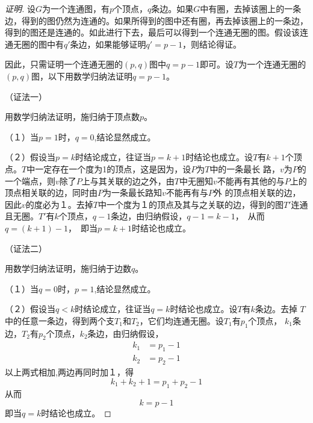 \begin{proof}[证明]
      设$G$为一个连通图，有$p$个顶点，$q$条边。如果$G$中有圈，去掉该圈上的一条边，得到的图仍然为连通的。如果所得到的图中还有圈，再去掉该圈上的一条边，得到的图还是连通的。如此进行下去，最后可以得到一个连通无圈的图。假设该连通无圈的图中有$q'$条边，如果能够证明$q'=p-1$，则结论得证。

    因此，只需证明一个连通无圈的$(p,q)$图中$q=p-1$即可。设$T$为一个连通无圈的$(p,q)$图，以下用数学归纳法证明$q=p-1$。

    
  （证法一）
  
    用数学归纳法证明，施归纳于顶点数$p$。
    
    （１）当$p=1$时，$q=0$,结论显然成立。

    （２）假设当$p=k$时结论成立，往证当$p=k+1$时结论也成立。设$T$有$k+1$个顶点。$T$中一定存在一个度为1的顶点，这是因为，设$P$为$T$中的一条最长
    路，$v$为$P$的一个端点，则$v$除了$P$上与其关联的边之外，由$T$中无圈知$v$不能再有其他的与$P$上的顶点相关联的边，同时由$P$为一条最长路知$v$不能再有与$P$外
    的顶点相关联的边，因此$v$的度必为１。去掉$T$中一个度为１的顶点及其与之关联的边，得到的图$T'$连通且无圈。$T'$有$k$个顶点，$q-1$条边，由归纳假设，$q-1 = k - 1$，　从而$q = (k +1) - 1$，　即当$p=k+1$时结论也成立。

    （证法二）
    
      用数学归纳法证明，施归纳于边数$q$。
    
    （１）当$q=0$时，$p=1$,结论显然成立。

    （２）假设当$q<k$时结论成立，往证当$q=k$时结论也成立。设$T$有$k$条边。去掉
    $T$中的任意一条边，得到两个支$T_1$和$T_2$，它们均连通无圈。设$T_1$有$p_1$个顶点，
    $k_1$条边，$T_2$有$p_2$个顶点，$k_2$条边，由归纳假设，
    \begin{equation*}
      \begin{split}
        k_1 &= p_1 - 1\\
        k_2 &= p_2 - 1
      \end{split}
    \end{equation*}
    以上两式相加,两边再同时加１，得
    \[k_1 + k_2  + 1 = p_1 + p_2 - 1\]
    从而
    \[k = p - 1 \]
    即当$q=k$时结论也成立。
\end{proof}
